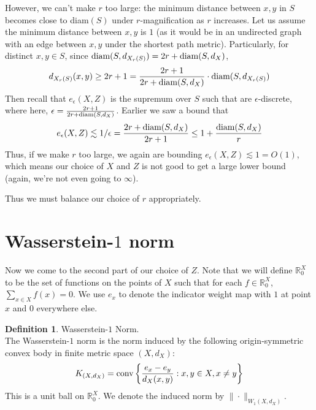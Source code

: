 \documentclass[10pt]{article}
\theoremstyle{definition}
\newtheorem{definition}[theorem]{Definition}
\theoremstyle{definition}
\theoremstyle{definition}
\theoremstyle{definition}
\newcommand{\R}
{\mathbb{R}}
\newcommand{\txt}[1]
{\textnormal{#1}}
\begin{document}
However, we can't make $r$ too large: the minimum distance between $x, y$ in $S$ becomes close to diam$(S)$ under $r$-magnification as $r$ increases. Let us assume the minimum distance between $x, y$ is $1$ (as it would be in an undirected graph with an edge between $x, y$ under the shortest path metric). Particularly, for distinct $x, y \in S$, since $\txt{diam}(S, d_{X_r(S)}) = 2r + \txt{diam}(S, d_X)$, 
\[
d_{X_r(S)}(x, y) \geq 2r + 1 = \frac{2r + 1}{2r + \txt{diam}(S, d_X)} \cdot \txt{diam}(S, d_{X_r(S)})
\]
Then recall that $e_{\epsilon}(X, Z)$ is the supremum over $S$ such that are $\epsilon$-discrete, where here, $\epsilon = \frac{2r + 1}{2r + \txt{diam}(S, d_X)}$. Earlier we saw a bound that 
\[
e_{\epsilon}(X, Z) \lesssim 1/\epsilon = \frac{2r + \txt{diam}(S, d_X)}{2r + 1} \leq 1 + \frac{\txt{diam}(S, d_X)}{r}
\]
Thus, if we make $r$ too large, we again are bounding $e_{\epsilon}(X, Z) \lesssim 1 = O(1)$, which means our choice of $X$ and $Z$ is not good to get a large lower bound (again, we're not even going to $\infty$). 

Thus we must balance our choice of $r$ appropriately.

\section{Wasserstein-$1$ norm}

Now we come to the second part of our choice of $Z$. Note that we will define $\R_0^X$ to be the set of functions on the points of $X$ such that for each $f \in \R_0^X$, $\sum_{x \in X} f(x) = 0$. We use $e_x$ to denote the indicator weight map with $1$ at point $x$ and $0$ everywhere else.

\begin{definition} Wasserstein-$1$ Norm. \\
The Wasserstein-$1$ norm is the norm induced by the following origin-symmetric convex body in finite metric space $(X, d_X)$:
\[
K_{(X, d_X)} = \txt{conv}\left\{\frac{e_x - e_y}{d_X(x, y)}: x, y \in X, x \neq y \right\}
\]
This is a unit ball on $\R_0^X$. We denote the induced norm by $\|\cdot\|_{W_1(X, d_X)}$. 
\end{definition}
\end{document}
